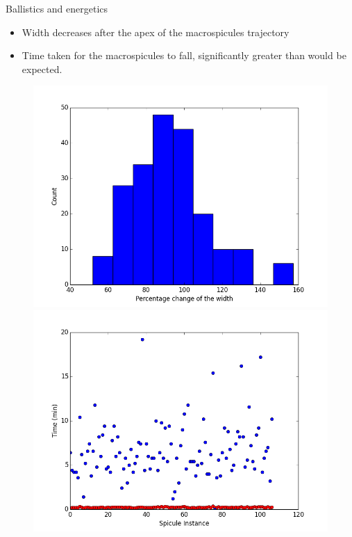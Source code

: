 \documentclass{beamer}
\begin{document}
	\begin{frame}{Ballistics and energetics}
		\begin{itemize}
			\item{Width decreases after the apex of the macrospicules trajectory}
			\item{Time taken for the macrospicules to fall, significantly greater than would be expected.}
		\end{itemize}
		
		\begin{figure}
			\centering
				\includegraphics[scale = 0.25]{Figs/width_percent.png}
				\includegraphics[scale = 0.25]{Figs/times_falling.png}
		\end{figure}
	\end{frame}
	
\end{document}
